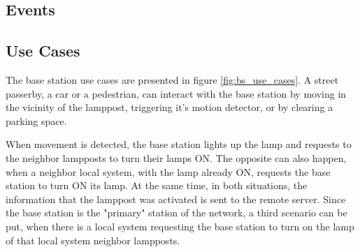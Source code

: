 \subsection{Events}

\begin{table}[h]
	\centering
	
	\caption{Base station events.}
	\label{table:bs_events}
\end{table}


\subsection{Use Cases}
The base station use cases are presented in figure \ref{fig:bs_use_cases}. A street passerby, a car or a pedestrian, can interact with the base station by moving in the vicinity of the lamppost, triggering it's motion detector, or by clearing a parking space.

When movement is detected, the base station lights up the lamp and requests to the neighbor lampposts to turn their lamps ON. The opposite can also happen, when a neighbor local system, with the lamp already ON, requests the base station to turn ON its lamp. At the same time, in both situations, the information that the lamppost was activated is sent to the remote server. Since the base station is the "primary" station of the network, a third scenario can be put, when there is a local system requesting the base station to turn on the lamp of that local system neighbor lampposts.

